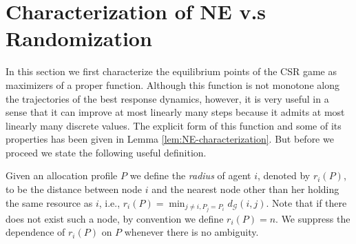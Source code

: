 \section{Characterization of NE v.s Randomization}\label{sec:main-I}


In this section we first characterize the equilibrium points of the CSR game as maximizers of a proper function. Although this function is not monotone along the trajectories of the best response dynamics, however, it is very useful in a sense that it can improve at most linearly many steps because it admits at most linearly many discrete values. The explicit form of this function and some of its properties has been given in Lemma \ref{lem:NE-characterization}. But before we proceed we state the following useful definition.

\begin{definition}\label{def:radius}
Given an allocation profile $P$ we define the \textit{radius} of agent $i$, denoted by $r_i(P)$, to be the distance between node $i$ and the nearest node other than her holding the same resource as $i$, i.e., $r_i(P)=\min_{ j\neq i, P_j=P_i}d_{\mathcal{G}}(i,j)$. Note that if there does not exist such a node, by convention we define $r_i(P)=n$. We suppress the dependence of $r_i(P)$ on $P$ whenever there is no ambiguity.
\end{definition}


